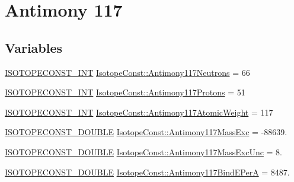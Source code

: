 \hypertarget{group___isotope_const-_antimony-_sb117}{}\section{Antimony 117}
\label{group___isotope_const-_antimony-_sb117}
\subsection*{Variables}
\begin{DoxyCompactItemize}
\item 
\mbox{\hyperlink{group___isotope_const-_macros_ga5f18360b3e99483a35c32d789e62621c}{I\+S\+O\+T\+O\+P\+E\+C\+O\+N\+S\+T\+\_\+\+I\+NT}} \mbox{\hyperlink{group___isotope_const-_antimony-_sb117_gabcdd6f8277c96d44867b74b92a8f05ca}{Isotope\+Const\+::\+Antimony117\+Neutrons}} = 66
\item 
\mbox{\hyperlink{group___isotope_const-_macros_ga5f18360b3e99483a35c32d789e62621c}{I\+S\+O\+T\+O\+P\+E\+C\+O\+N\+S\+T\+\_\+\+I\+NT}} \mbox{\hyperlink{group___isotope_const-_antimony-_sb117_gae30b7d83a8d770a65cb46a4fe8f4743c}{Isotope\+Const\+::\+Antimony117\+Protons}} = 51
\item 
\mbox{\hyperlink{group___isotope_const-_macros_ga5f18360b3e99483a35c32d789e62621c}{I\+S\+O\+T\+O\+P\+E\+C\+O\+N\+S\+T\+\_\+\+I\+NT}} \mbox{\hyperlink{group___isotope_const-_antimony-_sb117_ga9624b270c38e803db211d0d4fe2ca164}{Isotope\+Const\+::\+Antimony117\+Atomic\+Weight}} = 117
\item 
\mbox{\hyperlink{group___isotope_const-_macros_ga8f45a7272ce02c0b4c65c44636ed719a}{I\+S\+O\+T\+O\+P\+E\+C\+O\+N\+S\+T\+\_\+\+D\+O\+U\+B\+LE}} \mbox{\hyperlink{group___isotope_const-_antimony-_sb117_ga9d7f87558dc086cb0264d450c46271f9}{Isotope\+Const\+::\+Antimony117\+Mass\+Exc}} = -\/88639.
\item 
\mbox{\hyperlink{group___isotope_const-_macros_ga8f45a7272ce02c0b4c65c44636ed719a}{I\+S\+O\+T\+O\+P\+E\+C\+O\+N\+S\+T\+\_\+\+D\+O\+U\+B\+LE}} \mbox{\hyperlink{group___isotope_const-_antimony-_sb117_ga3698f18b5229c3e9ffb5182d488d944b}{Isotope\+Const\+::\+Antimony117\+Mass\+Exc\+Unc}} = 8.
\item 
\mbox{\hyperlink{group___isotope_const-_macros_ga8f45a7272ce02c0b4c65c44636ed719a}{I\+S\+O\+T\+O\+P\+E\+C\+O\+N\+S\+T\+\_\+\+D\+O\+U\+B\+LE}} \mbox{\hyperlink{group___isotope_const-_antimony-_sb117_gab18f973e867f5442539eb44ea81d6501}{Isotope\+Const\+::\+Antimony117\+Bind\+E\+PerA}} = 8487.
\item 

\end{DoxyCompactItemize}
